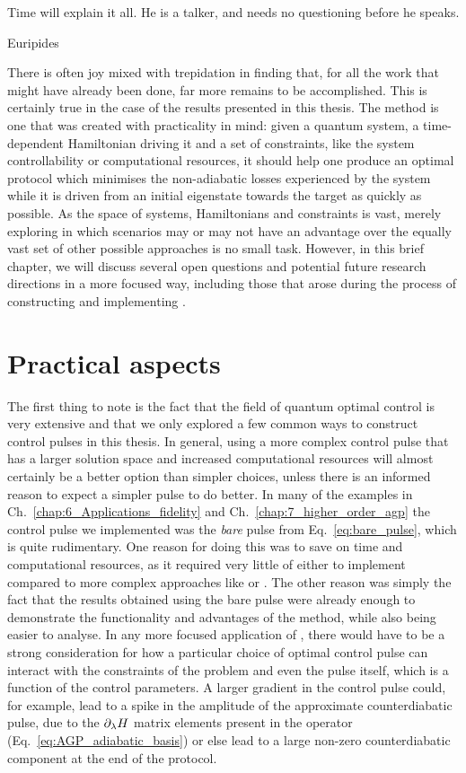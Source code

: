 \epigraph{Time will explain it all. He is a talker, and needs no questioning before he speaks.}{Euripides}

There is often joy mixed with trepidation in finding that, for all the work that might have already been done, far more remains to be accomplished. This is certainly true in the case of the results presented in this thesis. The  method is one that was created with practicality in mind: given a quantum system, a time-dependent Hamiltonian driving it and a set of constraints, like the system controllability or computational resources, it should help one produce an optimal protocol which minimises the non-adiabatic losses experienced by the system while it is driven from an initial eigenstate towards the target as quickly as possible. As the space of systems, Hamiltonians and constraints is vast, merely exploring in which scenarios  may or may not have an advantage over the equally vast set of other possible approaches is no small task. However, in this brief chapter, we will discuss several open questions and potential future research directions in a more focused way, including those that arose during the process of constructing and implementing . 

\section{Practical aspects}

The first thing to note is the fact that the field of quantum optimal control is very extensive and that we only explored a few common ways to construct control pulses in this thesis. In general, using a more complex control pulse that has a larger solution space and increased computational resources will almost certainly be a better option than simpler choices, unless there is an informed reason to expect a simpler pulse to do better. In many of the examples in Ch.~\ref{chap:6_Applications_fidelity} and Ch.~\ref{chap:7_higher_order_agp} the control pulse we implemented was the \emph{bare} pulse from Eq.~\eqref{eq:bare_pulse}, which is quite rudimentary. One reason for doing this was to save on time and computational resources, as it required very little of either to implement compared to more complex approaches like  or . The other reason was simply the fact that the results obtained using the bare pulse were already enough to demonstrate the functionality and advantages of the method, while also being easier to analyse. In any more focused application of , there would have to be a strong consideration for how a particular choice of optimal control pulse can interact with the constraints of the problem and even the  pulse itself, which is a function of the control parameters. A larger gradient in the control pulse could, for example, lead to a spike in the amplitude of the approximate counterdiabatic pulse, due to the $\partial_{\lambda} H$ matrix elements present in the  operator (Eq.~\eqref{eq:AGP_adiabatic_basis}) or else lead to a large non-zero counterdiabatic component at the end of the protocol. 

